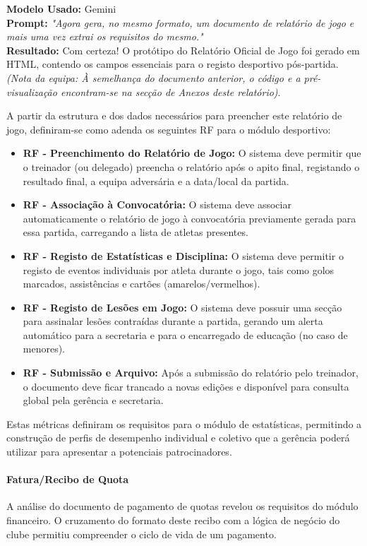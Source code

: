 \documentclass[a4paper,12pt]{scrreprt}
\newcommand{\caixaprompt}[3]{
    \begin{tcolorbox}[
        enhanced,
        colback=azulclaro,      %
        colframe=blue!50!black, %
        arc=2mm,                %
        boxrule=0.5mm,          %
        title=\textbf{Documentação de IA}, %
        fonttitle=\sffamily,
        coltitle=black,
        attach title to upper,
        after title={\par\medskip},
    ]
        \textbf{Modelo Usado:} #1 \\
        \textbf{Prompt:} \textit{"#2"} \\
        \tcbline %
        \textbf{Resultado:} #3
    \end{tcolorbox}
}
\begin{document}
{\caixaprompt{Gemini}{Agora gera, no mesmo formato, um documento de relatório de jogo e mais uma vez extrai os requisitos do mesmo.}{Com certeza! O protótipo do Relatório Oficial de Jogo foi gerado em HTML, contendo os campos essenciais para o registo desportivo pós-partida. \textit{(Nota da equipa: À semelhança do documento anterior, o código e a pré-visualização encontram-se na secção de Anexos deste relatório)}.}

A partir da estrutura e dos dados necessários para preencher este relatório de jogo, definiram-se como adenda os seguintes RF para o módulo desportivo:

\begin{itemize}
    \item \textbf{RF - Preenchimento do Relatório de Jogo:} O sistema deve permitir que o treinador (ou delegado) preencha o relatório após o apito final, registando o resultado final, a equipa adversária e a data/local da partida.
    \item \textbf{RF - Associação à Convocatória:} O sistema deve associar automaticamente o relatório de jogo à convocatória previamente gerada para essa partida, carregando a lista de atletas presentes.
    \item \textbf{RF - Registo de Estatísticas e Disciplina:} O sistema deve permitir o registo de eventos individuais por atleta durante o jogo, tais como golos marcados, assistências e cartões (amarelos/vermelhos).
    \item \textbf{RF - Registo de Lesões em Jogo:} O sistema deve possuir uma secção para assinalar lesões contraídas durante a partida, gerando um alerta automático para a secretaria e para o encarregado de educação (no caso de menores).
    \item \textbf{RF - Submissão e Arquivo:} Após a submissão do relatório pelo treinador, o documento deve ficar trancado a novas edições e disponível para consulta global pela gerência e secretaria.
\end{itemize}

Estas métricas definiram os requisitos para o módulo de estatísticas, permitindo a construção de perfis de desempenho individual e coletivo que a gerência poderá utilizar para apresentar a potenciais patrocinadores.

\paragraph{Fatura/Recibo de Quota}

A análise do documento de pagamento de quotas revelou os requisitos do módulo financeiro. O cruzamento do formato deste recibo com a lógica de negócio do clube permitiu compreender o ciclo de vida de um pagamento.

}
\end{document}
